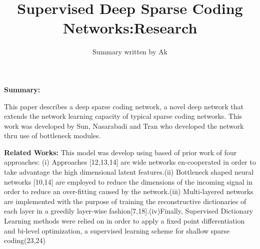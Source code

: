 \documentclass[10pt,twocolumn,letterpaper]{article}
\begin{document}
\title{Supervised Deep Sparse Coding Networks:Research }
\author{Summary written by Ak}
\maketitle

\noindent\textbf{Summary: }

This paper describes a deep sparse coding network, a novel deep network that extends the network learning capacity of typical sparse coding networks. This work was developed by Sun, Nasarabadi and Tran who developed the network thru use of bottleneck modules.


\noindent\textbf{Related Works: }
This model was develop using based of prior work of four approaches: (i) Approaches [12,13,14] are wide networks en-cooperated in order to take advantage the high dimensional latent features.(ii) Bottleneck shaped neural networks [10,14] are employed to reduce the dimensions of the incoming signal in order to reduce an over-fitting caused by the network.(iii) Multi-layered networks are implemented with the purpose of training the reconstructive dictionaries of each layer in a greedily layer-wise fashion[7,18].(iv)Finally, Supervised Dictionary Learning methods were  relied on in order to apply a fixed point differentiation and bi-level optimization, a supervised learning scheme for shallow sparse coding(23,24) 
\end{document}

